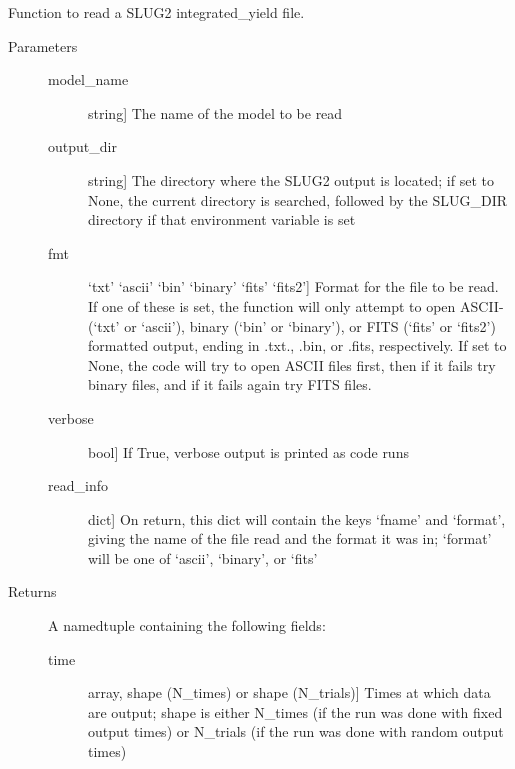 \documentclass[letterpaper,10pt,english]{sphinxmanual}
\begin{document}
\begin{fulllineitems}
\label{\detokenize{slugpy:slugpy.read_integrated_yield}}
Function to read a SLUG2 integrated\_yield file.
\begin{description}
\item[{Parameters}] \leavevmode\begin{description}
\item[{model\_name}] \leavevmode{[}string{]}
The name of the model to be read

\item[{output\_dir}] \leavevmode{[}string{]}
The directory where the SLUG2 output is located; if set to None,
the current directory is searched, followed by the SLUG\_DIR
directory if that environment variable is set

\item[{fmt}] \leavevmode{[}‘txt’ \textbar{} ‘ascii’ \textbar{} ‘bin’ \textbar{} ‘binary’ \textbar{} ‘fits’ \textbar{} ‘fits2’{]}
Format for the file to be read. If one of these is set, the
function will only attempt to open ASCII-(‘txt’ or ‘ascii’), 
binary (‘bin’ or ‘binary’), or FITS (‘fits’ or ‘fits2’)
formatted output, ending in .txt., .bin, or .fits,
respectively. If set to None, the code will try to open
ASCII files first, then if it fails try binary files, and if
it fails again try FITS files.

\item[{verbose}] \leavevmode{[}bool{]}
If True, verbose output is printed as code runs

\item[{read\_info}] \leavevmode{[}dict{]}
On return, this dict will contain the keys ‘fname’ and
‘format’, giving the name of the file read and the format it
was in; ‘format’ will be one of ‘ascii’, ‘binary’, or ‘fits’

\end{description}

\item[{Returns}] \leavevmode
A namedtuple containing the following fields:
\begin{description}
\item[{time}] \leavevmode{[}array, shape (N\_times) or shape (N\_trials){]}
Times at which data are output; shape is either N\_times (if
the run was done with fixed output times) or N\_trials (if
the run was done with random output times)


\end{description}
\end{description}
\end{fulllineitems}
\end{document}
